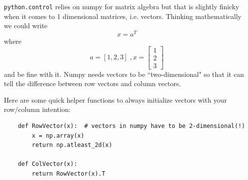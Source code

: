 {\tt python.control} relies on {numpy} for matrix algebra but that is
slightly finicky when it comes to 1 dimensional matrices, i.e. vectors.
Thinking mathematically we could write
\[
x = a^T
\]
where
\[ a = [1, 2, 3] \;, x = \begin{bmatrix} 1\\2\\3 \end{bmatrix}
\]
and be fine with it.   Numpy needs vectors to be ``two-dimensional" so that it
can tell the difference between row vectors and column vectors.

Here are some quick helper functions to always initialize vectors with your
row/column intention:
\begin{verbatim}
    def RowVector(x):  # vectors in numpy have to be 2-dimensional(!)
        x = np.array(x)
        return np.atleast_2d(x)

    def ColVector(x):
        return RowVector(x).T
\end{verbatim}





